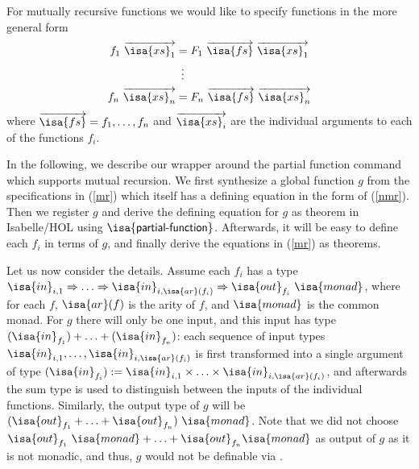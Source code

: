 \documentclass[11pt,a4paper]{article}
\newcommand\isakwd[1]{\textsf{\isa{#1}}}
\newcommand\parfun{\isakwd{partial-function}}
\newcommand\vect[1]{\overrightarrow{#1}}
\newcommand\fs{\isa{fs}}
\newcommand\xs{\isa{xs}}
\newcommand\inT{\isa{in}}
\newcommand\cprod[1]{({#1})}
\newcommand\outT{\isa{out}}
\newcommand\monad{\isa{monad}}
\newcommand\tto\Rightarrow
\newcommand\ar{\isa{ar}}
\begin{document}
For mutually recursive functions we would like to specify functions in the more general form
\begin{align}
\notag f_1\ \vect{\xs_1} & = F_1\ \vect{\fs}\ \vect{\xs_1} \\
\label{mr} & \ \,\vdots \\
\notag f_n\ \vect{\xs_n} & = F_n\ \vect{\fs}\ \vect{\xs_n} 
\end{align}
where $\vect{\fs} = f_1, \ldots, f_n$ and $\vect{\xs_i}$ are the individual arguments to each of
the functions $f_i$.

In the following, we describe our wrapper around the partial function command which supports 
mutual recursion. We first 
synthesize a global function $g$ from the specifications in (\ref{mr}) which itself
has a defining equation in the form of (\ref{nmr}). 
Then we register $g$ and derive the defining equation for $g$ as theorem in Isabelle/HOL 
using $\parfun$. Afterwards,
it will be easy to define each $f_i$ in terms of $g$, and finally
derive the equations in (\ref{mr}) as theorems.

Let us now consider the details. Assume each $f_i$ has a type $\inT_{i,1} \tto
\ldots \tto \inT_{i,\ar(f_i)} \tto \outT_{f_i}\ \monad$, where for each $f$, $\ar(f)$ is the arity of $f$, and $\monad$ is the common monad.
For $g$ there will only be one input, and this input has type $\cprod{\inT_{f_1}} + \ldots + \cprod{\inT_{f_n}}$:
each sequence of input types
$\inT_{i,1}, \ldots, \inT_{i,\ar(f_i)}$ is first transformed into a single argument of 
type $\cprod{\inT_{f_i}} := \inT_{i,1} \times \ldots \times \inT_{i,\ar(f_i)}$,
and afterwards the sum type is used to distinguish between the inputs of the individual functions.
Similarly, the output type of $g$ will be $(\outT_{f_1} + \ldots + \outT_{f_n})\ \monad$.
Note that we did not choose ${\outT_{f_1}\ \monad} + \ldots + {\outT_{f_n} \monad}$ as output of $g$ 
as it is not monadic, and thus, $g$ would not be definable via \parfun.
\end{document}
